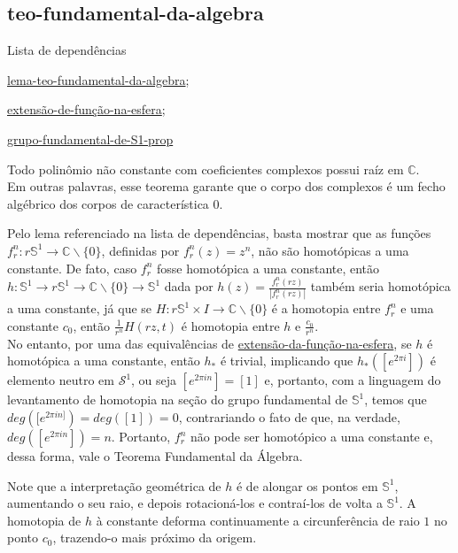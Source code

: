 \subsection{teo-fundamental-da-algebra} %
\label{teo-fundamental-da-algebra}
\begin{titlemize}{Lista de dependências}
	\item \hyperref[lema-teo-fundamental-da-algebra]{lema-teo-fundamental-da-algebra};\\ %
	\item \hyperref[extensão-de-função-na-esfera]{extensão-de-função-na-esfera};\\
  \item \hyperref[grupo-fundamental-de-S1-prop]{grupo-fundamental-de-S1-prop}
\end{titlemize}
\begin{thm}

	Todo polinômio não constante com coeficientes complexos possui raíz em $\mathbb{C}$. \\
 
 Em outras palavras, esse teorema garante que o corpo dos complexos é um fecho algébrico dos corpos de característica 0.
 
\end{thm}

\begin{dem}

Pelo lema referenciado na lista de dependências, basta mostrar que as funções $f_r^n: r\mathbb{S}^1 \rightarrow \mathbb{C}\backslash\{0\}$, definidas por $f_r^n(z) = z^n$, não são homotópicas a uma constante.
De fato, caso $f_r^n$ fosse homotópica a uma constante, então $h: \mathbb{S}^1 \rightarrow r\mathbb{S}^1 \rightarrow \mathbb{C}\backslash\{0\} \rightarrow \mathbb{S}^1$ dada por $h(z) = \frac{f_r^n(rz)}{|f_r^n(rz)|}$ também seria homotópica a uma constante, já que se $H:r\mathbb{S}^1 \times I \rightarrow \mathbb{C}\backslash\{0\}$ é a homotopia entre $f_r^n$ e uma constante $c_0$, então $\frac{1}{r^n}H(rz, t)$ é homotopia entre $h$ e $\frac{c_0}{r^n}$.\\
No entanto, por uma das equivalências de \hyperref[extensão-da-função-na-esfera]{extensão-da-função-na-esfera}, se $h$ é homotópica a uma constante, então $h_*$ é trivial, implicando que $h_*([e^{2\pi i}])$ é elemento neutro em $\mathcal{S}^1$, ou seja $[e^{2\pi in}] = [1]$ e, portanto, com a linguagem do levantamento de homotopia na seção do grupo fundamental de $\mathbb{S}^1$, temos que $deg([e^{2\pi in]}) = deg([1]) = 0$, contrariando o fato de que, na verdade, $deg([e^{2\pi in}]) = n$. Portanto, $f_r^n$ não pode ser homotópico a uma constante e, dessa forma, vale o Teorema Fundamental da Álgebra.

    
\end{dem}

Note que a interpretação geométrica de $h$ é de alongar os pontos em $\mathbb{S}^1$, aumentando o seu raio, e depois rotacioná-los e contraí-los de volta a $\mathbb{S}^1$. A homotopia de $h$ à constante deforma continuamente a circunferência de raio $1$ no ponto $c_0$, trazendo-o mais próximo da origem.
